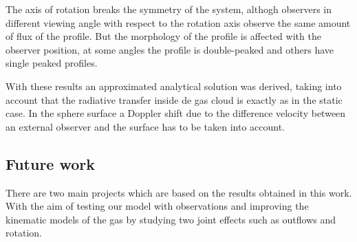 The axis of rotation breaks the symmetry of the system, althogh 
observers in different viewing angle with respect to the rotation axis
observe the same amount of flux of the \ly profile. But the morphology
of the profile is affected with the observer position, at some angles
the profile is double-peaked and others have single peaked profiles. 
 
 
With these results an approximated analytical solution was derived, 
taking into account that the radiative transfer inside de gas
cloud is exactly as in the static case. In the sphere surface
a Doppler shift due to the difference velocity between an external 
observer and the surface has to be taken into account.  


\subsection{Future work}


There are two main projects which are based on the results obtained in 
this work. With the aim of testing our model with observations and
improving the kinematic models of the gas by studying two joint effects
such as outflows and rotation.  

